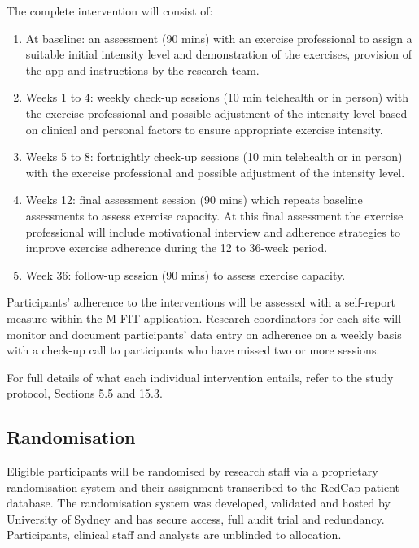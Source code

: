 \documentclass[
]{article}
\begin{document}
The complete intervention will consist of:

\begin{enumerate}
  \def\labelenumi{\arabic{enumi}.}
  \item At baseline: an assessment (90 mins) with an exercise professional to assign a suitable initial intensity level and demonstration of the exercises, provision of the app and instructions by the research team.
  \item Weeks 1 to 4: weekly check-up sessions (10 min telehealth or in person) with the exercise professional and possible adjustment of the intensity level based on clinical and personal factors to ensure appropriate exercise intensity.
  \item Weeks 5 to 8: fortnightly check-up sessions (10 min telehealth or in person) with the exercise professional and possible adjustment of the intensity level.
  \item Weeks 12: final assessment session (90 mins) which repeats baseline assessments to assess exercise capacity. At this final assessment the exercise professional will include motivational interview and adherence strategies to improve exercise adherence during the 12 to 36-week period.
  \item Week 36: follow-up session (90 mins) to assess exercise capacity.
\end{enumerate}

Participants’ adherence to the interventions will be assessed with a self-report measure within the M-FIT application.
Research coordinators for each site will monitor and document participants’ data entry on adherence on a weekly basis with a check-up call to participants who have missed two or more sessions.

For full details of what each individual intervention entails, refer to the study protocol, Sections 5.5 and 15.3.

\hypertarget{randomisation}{%
  \subsection{Randomisation}\label{randomisation}}

Eligible participants will be randomised by research staff via a proprietary randomisation system and their assignment transcribed to the RedCap patient database.
The randomisation system was developed, validated and hosted by University of Sydney and has secure access, full audit trial and redundancy.
Participants, clinical staff and analysts are unblinded to allocation.
\end{document}
